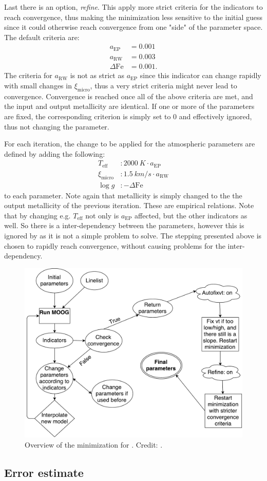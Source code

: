 Last there is an option, \emph{refine}. This apply more strict criteria for the
indicators to reach convergence, thus making the minimization less sensitive to
the initial guess since it could otherwise reach convergence from one "side" of
the parameter space. The default criteria are:
\begin{align*}
  a_\mathrm{EP}     &= 0.001\\
  a_\mathrm{RW}     &= 0.003\\
  \Delta\mathrm{Fe} &= 0.001.
\end{align*}
The criteria for $a_\mathrm{RW}$ is not as strict as $a_\mathrm{EP}$ since this
indicator can change rapidly with small changes in $\xi_\mathrm{micro}$, thus a
very strict criteria might never lead to convergence. Convergence is reached
once all of the above criteria are met, and the input and output metallicity are
identical. If one or more of the parameters are fixed, the corresponding
criterion is simply set to 0 and effectively ignored, thus not changing the
parameter.

For each iteration, the change to be applied for the atmospheric parameters are
defined by adding the following:
\begin{align}
  T_\mathrm{eff}     &: \SI{2000}{K} \cdot a_\mathrm{EP}   \\
  \xi_\mathrm{micro} &: \SI{1.5}{km/s} \cdot a_\mathrm{RW} \\
  \log g             &: -\Delta\mathrm{Fe}
\end{align}
to each parameter. Note again that metallicity is simply changed to the the
output metallicity of the previous iteration. These are empirical relations.
Note that by changing e.g. $T_\mathrm{eff}$ not only is $a_\mathrm{EP}$
affected, but the other indicators as well. So there is a inter-dependency
between the parameters, however this is ignored by \FASMA as it is not a simple
problem to solve. The stepping presented above is chosen to rapidly reach
convergence, without causing problems for the inter-dependency.

\begin{figure}[htpb!]
    \centering
    \includegraphics[width=0.85\linewidth]{figures/FASMA_minimization.pdf}
    \caption{Overview of the minimization for \FASMA. Credit: \citet{Andreasen2017a}.}
    \label{fig:minimization}
\end{figure}

\subsection{Error estimate}
